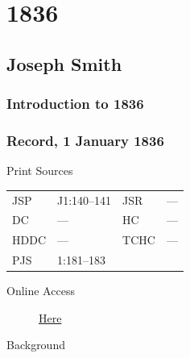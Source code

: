 \section{1836}
	\label{EMS-1836}
	
	\subsection{Joseph Smith}
		\label{EMS-1836-JS}

		\subsubsection{Introduction to 1836}
		
		\subsubsection{Record, 1 January 1836}
			\label{EMS-1836-JS-1-JAN-1836}
			
			\begin{description}
					\item[Print Sources]
				\end{description}

					\begin{tabular}{p{0.5in}p{1in}p{0.5in}p{1in}}
					JSP	 	& J1:140--141		& JSR 		& --- \\
					DC	 	& ---				& HC 		& --- \\
					HDDC 	& ---				& TCHC 		& --- \\
					PJS 	& 1:181--183			& 	 		&  \\
					\end{tabular}
				
				\begin{description}
					\item[Online Access] \href{https://www.josephsmithpapers.org/paper-summary/journal-1835-1836/95}{Here}
				\end{description}
				
				\begin{description}
					\item[Background]
				\end{description}
				
